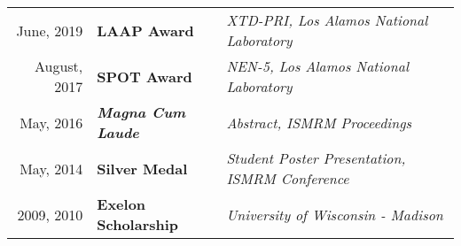 
\begin{minipage}{\textwidth}
\begin{tabular}{r|ll}
	June, 2019 &	\textbf{LAAP Award} & \textit{XTD-PRI, Los Alamos National Laboratory} \\
	August, 2017 &	\textbf{SPOT Award} & \textit{NEN-5, Los Alamos National Laboratory} \\
	May, 2016 & \textit{\textbf{Magna Cum Laude}} & \textit{Abstract, ISMRM Proceedings} \\
	May, 2014 & \textbf{Silver Medal} & \textit{Student Poster Presentation, ISMRM Conference} \\
	2009, 2010 & \textbf{Exelon Scholarship} & \textit{University of Wisconsin - Madison} \\
\end{tabular}
\end{minipage}
